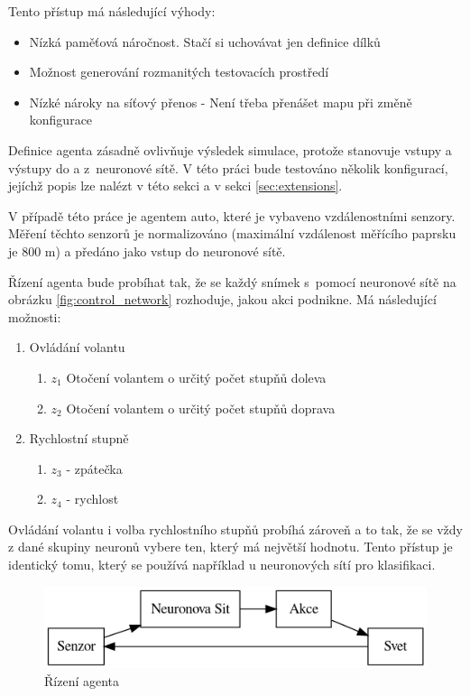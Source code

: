 Tento přístup má následující výhody:
\begin{itemize}
	\item Nízká paměťová náročnost. Stačí si uchovávat jen definice dílků
	\item Možnost generování rozmanitých testovacích prostředí
	\item Nízké nároky na síťový přenos - Není třeba přenášet mapu při změně konfigurace
\end{itemize}

\label{sec:agent}
Definice agenta zásadně ovlivňuje výsledek simulace, protože stanovuje vstupy a výstupy do a z~neuronové sítě. V této práci bude testováno několik konfigurací, jejíchž popis lze nalézt v této sekci a v sekci \ref{sec:extensions}.

V případě této práce je agentem auto, které je vybaveno vzdálenostními senzory. Měření těchto senzorů je normalizováno (maximální vzdálenost měřícího paprsku je 800 m) a předáno jako vstup do neuronové sítě.

Řízení agenta bude probíhat tak, že se každý snímek s~pomocí neuronové sítě na obrázku \ref{fig:control_network} rozhoduje, jakou akci podnikne. Má následující možnosti:

\begin{enumerate}
	\item Ovládání volantu 
	\begin{enumerate}
		\item $z_1$ Otočení volantem o určitý počet stupňů doleva
		\item $z_2$ Otočení volantem o určitý počet stupňů doprava
	\end{enumerate} 
	\item Rychlostní stupně
	\begin{enumerate}
		\item $z_3$ - zpátečka
		\item $z_4$ - rychlost
	\end{enumerate}
\end{enumerate}

Ovládání volantu i volba rychlostního stupňů probíhá zároveň a to tak, že se vždy z dané skupiny neuronů vybere ten, který má největší hodnotu. Tento přístup je identický tomu, který se používá například u neuronových sítí pro klasifikaci.

\begin{figure}[H]
	\centering
	\includegraphics[width=0.7\linewidth]{AgentSchema}
	\caption{Řízení agenta}
	\label{fig:agentschema}
\end{figure}

